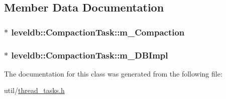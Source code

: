 \subsection{Member Data Documentation}
\hypertarget{classleveldb_1_1_compaction_task_a6aa12fd7c98ee35f88eb06f98d75881f}{}
\subsubsection[{m\+\_\+\+Compaction}]{$\ast$ leveldb\+::\+Compaction\+Task\+::m\+\_\+\+Compaction\hspace{0.3cm}{\ttfamily [protected]}}\label{classleveldb_1_1_compaction_task_a6aa12fd7c98ee35f88eb06f98d75881f}
\hypertarget{classleveldb_1_1_compaction_task_a85971ad8d94431ed47f1dc235ce630ad}{}
\subsubsection[{m\+\_\+\+D\+B\+Impl}]{$\ast$ leveldb\+::\+Compaction\+Task\+::m\+\_\+\+D\+B\+Impl\hspace{0.3cm}{\ttfamily [protected]}}\label{classleveldb_1_1_compaction_task_a85971ad8d94431ed47f1dc235ce630ad}


The documentation for this class was generated from the following file\+:\begin{DoxyCompactItemize}
\item 
util/\hyperlink{thread__tasks_8h}{thread\+\_\+tasks.\+h}\end{DoxyCompactItemize}
